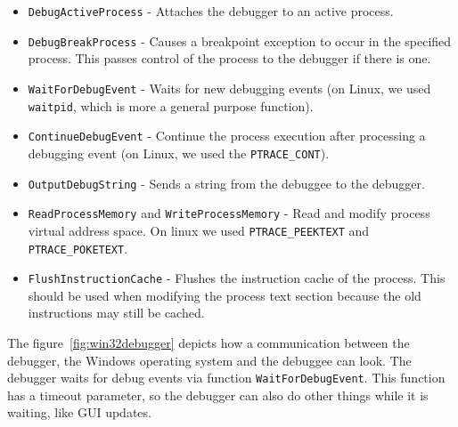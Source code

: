 \begin{itemize}
    \item \texttt{DebugActiveProcess} - Attaches the debugger to an
        active process.
    \item \texttt{DebugBreakProcess} - Causes a breakpoint exception to
        occur in the specified process. This passes control of the process to
        the debugger if there is one.
    \item \texttt{WaitForDebugEvent} - Waits for new debugging events
        (on Linux, we used \texttt{waitpid}, which is more a general purpose
        function).
    \item \texttt{ContinueDebugEvent} - Continue the process execution
        after processing a debugging event (on Linux, we used the
        \texttt{PTRACE\_CONT}).
    \item \texttt{OutputDebugString} - Sends a string from the debuggee
        to the debugger.
    \item \texttt{ReadProcessMemory} and
    \texttt{WriteProcessMemory} - Read and modify process virtual
        address space. On linux we used \texttt{PTRACE\_PEEKTEXT} and
        \texttt{PTRACE\_POKETEXT}.
    \item \texttt{FlushInstructionCache} - Flushes the instruction cache
        of the process. This should be used when modifying the process text
        section because the old instructions may still be cached.
\end{itemize}

The figure~\ref{fig:win32debugger} depicts how a communication between the
debugger, the Windows operating system and the debuggee can look. The debugger
waits for debug events via function \texttt{WaitForDebugEvent}. This
function has a timeout parameter, so the debugger can also do other things
while it is waiting, like GUI updates.

